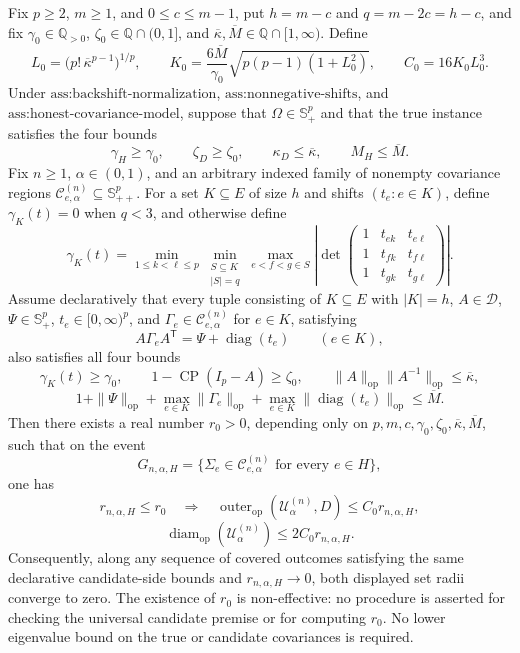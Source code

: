 Fix \(p\geq2\), \(m\geq1\), and \(0\leq c\leq m-1\), put \(h=m-c\) and \(q=m-2c=h-c\), and fix \(\gamma_0\in\mathbb Q_{>0}\), \(\zeta_0\in\mathbb Q\cap(0,1]\), and \(\overline\kappa,\overline M\in\mathbb Q\cap[1,\infty)\). Define
\[
L_0=\bigl(p!\,\overline\kappa^{p-1}\bigr)^{1/p},
\qquad
K_0=\frac{6\overline M}{\gamma_0}
\sqrt{p(p-1)(1+L_0^2)},
\qquad
C_0=16K_0L_0^3.
\]
Under \(\text{ass:backshift-normalization}\), \(\text{ass:nonnegative-shifts}\), and \(\text{ass:honest-covariance-model}\), suppose that \(\Omega\in\mathbb S_+^p\) and that the true instance satisfies the four bounds
\[
\gamma_H\geq\gamma_0,\qquad
\zeta_D\geq\zeta_0,\qquad
\kappa_D\leq\overline\kappa,\qquad
M_H\leq\overline M.
\]
Fix \(n\geq1\), \(\alpha\in(0,1)\), and an arbitrary indexed family of nonempty covariance regions \(\mathcal C^{(n)}_{e,\alpha}\subseteq\mathbb S_{++}^{p}\). For a set \(K\subseteq E\) of size \(h\) and shifts \((t_e:e\in K)\), define \(\gamma_K(t)=0\) when \(q<3\), and otherwise define
\[
\gamma_K(t)=
\min_{1\leq k<\ell\leq p}
\min_{\substack{S\subseteq K\\|S|=q}}
\max_{e<f<g\in S}
\left|
\det\begin{pmatrix}
1&t_{ek}&t_{e\ell}\\
1&t_{fk}&t_{f\ell}\\
1&t_{gk}&t_{g\ell}
\end{pmatrix}
\right|.
\]
Assume declaratively that every tuple consisting of \(K\subseteq E\) with \(|K|=h\), \(A\in\mathcal D\), \(\Psi\in\mathbb S_+^p\), \(t_e\in[0,\infty)^p\), and \(\Gamma_e\in\mathcal C^{(n)}_{e,\alpha}\) for \(e\in K\), satisfying
\[
A\Gamma_eA^{\mathsf T}=\Psi+\operatorname{diag}(t_e)
\qquad(e\in K),
\]
also satisfies all four bounds
\[
\gamma_K(t)\geq\gamma_0,
\qquad
1-\operatorname{CP}(I_p-A)\geq\zeta_0,
\qquad
\|A\|_{\mathrm{op}}\|A^{-1}\|_{\mathrm{op}}
\leq\overline\kappa,
\]
\[
1+\|\Psi\|_{\mathrm{op}}
+\max_{e\in K}\|\Gamma_e\|_{\mathrm{op}}
+\max_{e\in K}\|\operatorname{diag}(t_e)\|_{\mathrm{op}}
\leq\overline M.
\]
Then there exists a real number \(r_0>0\), depending only on \(p,m,c,\gamma_0,\zeta_0,\overline\kappa,\overline M\), such that on the event
\[
G_{n,\alpha,H}
=\{\Sigma_e\in\mathcal C^{(n)}_{e,\alpha}\text{ for every }e\in H\},
\]
one has
\[
r_{n,\alpha,H}\leq r_0
\quad\Longrightarrow\quad
\operatorname{outer}_{\mathrm{op}}(\mathcal U^{(n)}_\alpha,D)
\leq C_0r_{n,\alpha,H},
\]
\[
\operatorname{diam}_{\mathrm{op}}(\mathcal U^{(n)}_\alpha)
\leq2C_0r_{n,\alpha,H}.
\]
Consequently, along any sequence of covered outcomes satisfying the same declarative candidate-side bounds and \(r_{n,\alpha,H}\to0\), both displayed set radii converge to zero. The existence of \(r_0\) is non-effective: no procedure is asserted for checking the universal candidate premise or for computing \(r_0\). No lower eigenvalue bound on the true or candidate covariances is required.